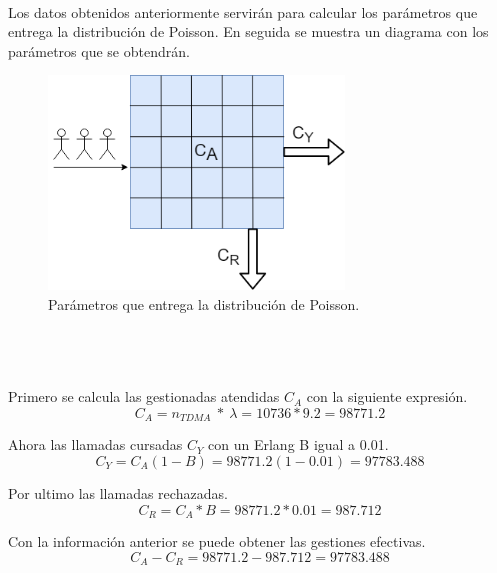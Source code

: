 \documentclass[11pt,letterpaper]{article}
\begin{document}
\\
Los datos obtenidos anteriormente servirán para calcular los parámetros que entrega 
la distribución de Poisson. En seguida se muestra un diagrama con los parámetros que se 
obtendrán.
\\ 
\begin{figure}[ht]
    \centering
    \includegraphics[width=0.7\textwidth]{imagenes/t34.png}
    \caption{Parámetros que entrega la distribución de Poisson.}
\end{figure}
\\ \\ \\
Primero se calcula las gestionadas atendidas $C_{A}$ con la siguiente expresión.
\begin{equation}
    C_A=n_{TDMA} \ * \ \lambda = 10736 * 9.2=98771.2
\end{equation}

Ahora las llamadas cursadas $C_Y$ con un Erlang B igual a 0.01.
\begin{equation}
    C_Y=C_A(1-B)=98771.2(1-0.01)=97783.488
\end{equation}

Por ultimo las llamadas rechazadas.
\begin{equation}
    C_R=C_A*B=98771.2*0.01=987.712
\end{equation}

Con la información anterior se puede obtener las gestiones efectivas.
\begin{equation}
    C_A-C_R=98771.2-987.712=97783.488
\end{equation}


\newpage
\end{document}
